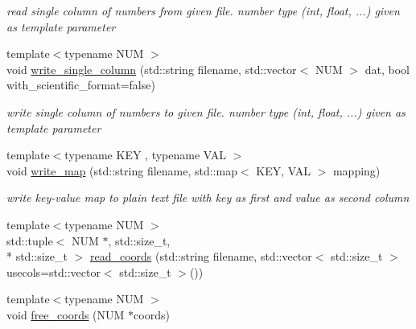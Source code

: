 \begin{DoxyCompactItemize}
\begin{DoxyCompactList}\small\item\em read single column of numbers from given file. number type (int, float, ...) given as template parameter \end{DoxyCompactList}\item 
\hypertarget{namespaceClustering_1_1Tools_ad222d7a138cec5b239a6411987641057}{{\footnotesize template$<$typename N\-U\-M $>$ }\\void \hyperlink{namespaceClustering_1_1Tools_ad222d7a138cec5b239a6411987641057}{write\-\_\-single\-\_\-column} (std\-::string filename, std\-::vector$<$ N\-U\-M $>$ dat, bool with\-\_\-scientific\-\_\-format=false)}\label{namespaceClustering_1_1Tools_ad222d7a138cec5b239a6411987641057}

\begin{DoxyCompactList}\small\item\em write single column of numbers to given file. number type (int, float, ...) given as template parameter \end{DoxyCompactList}\item 
\hypertarget{namespaceClustering_1_1Tools_ac2515e00fdf8b1865638aa357b59488a}{{\footnotesize template$<$typename K\-E\-Y , typename V\-A\-L $>$ }\\void \hyperlink{namespaceClustering_1_1Tools_ac2515e00fdf8b1865638aa357b59488a}{write\-\_\-map} (std\-::string filename, std\-::map$<$ K\-E\-Y, V\-A\-L $>$ mapping)}\label{namespaceClustering_1_1Tools_ac2515e00fdf8b1865638aa357b59488a}

\begin{DoxyCompactList}\small\item\em write key-\/value map to plain text file with key as first and value as second column \end{DoxyCompactList}\item 
{\footnotesize template$<$typename N\-U\-M $>$ }\\std\-::tuple$<$ N\-U\-M $\ast$, std\-::size\-\_\-t, \\*
std\-::size\-\_\-t $>$ \hyperlink{namespaceClustering_1_1Tools_a51cc8b199a29924bc8fac9ec39908408}{read\-\_\-coords} (std\-::string filename, std\-::vector$<$ std\-::size\-\_\-t $>$ usecols=std\-::vector$<$ std\-::size\-\_\-t $>$())
\item 
\hypertarget{namespaceClustering_1_1Tools_a39f368f7e662767d160e3c62e54c209d}{{\footnotesize template$<$typename N\-U\-M $>$ }\\void \hyperlink{namespaceClustering_1_1Tools_a39f368f7e662767d160e3c62e54c209d}{free\-\_\-coords} (N\-U\-M $\ast$coords)}\label{namespaceClustering_1_1Tools_a39f368f7e662767d160e3c62e54c209d}


\end{DoxyCompactItemize}
